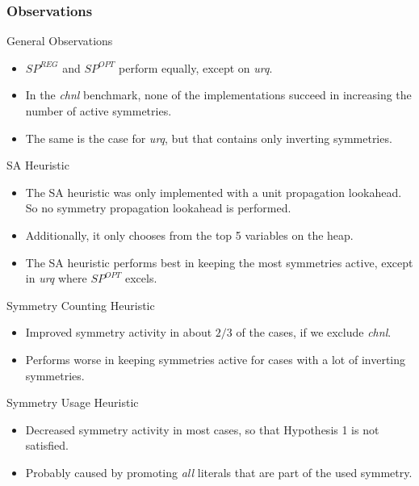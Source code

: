 \documentclass{beamer}
\begin{document}
	\begin{frame}[allowframebreaks]
		\frametitle{Observations}
		\begin{block}{General Observations}
			\begin{itemize}
				\item $SP^{REG}$ and $SP^{OPT}$ perform equally, except on \emph{urq}.
				\item In the \emph{chnl} benchmark, none of the implementations succeed in increasing the number of active symmetries.
				\item The same is the case for \emph{urq}, but that contains only inverting symmetries. %
			\end{itemize}
		\end{block}

		\begin{block}{SA Heuristic}
			\begin{itemize}
				\item The SA heuristic was only implemented with a unit propagation lookahead.
					So no symmetry propagation lookahead is performed.
				\item Additionally, it only chooses from the top 5 variables on the heap.
				\item The SA heuristic performs best in keeping the most symmetries active, except in \emph{urq} where $SP^{OPT}$ excels.
			\end{itemize}
		\end{block}

		\begin{block}{Symmetry Counting Heuristic}
			\begin{itemize}
				\item Improved symmetry activity in about $2/3$ of the cases, if we exclude \emph{chnl}.
				\item Performs worse in keeping symmetries active for cases with a lot of inverting symmetries.
			\end{itemize}
		\end{block}

		\begin{block}{Symmetry Usage Heuristic}
			\begin{itemize}
				\item Decreased symmetry activity in most cases, so that Hypothesis 1 is not satisfied.
				\item Probably caused by promoting \emph{all} literals that are part of the used symmetry.
			\end{itemize}
		\end{block}
	\end{frame}
	
\end{document}
